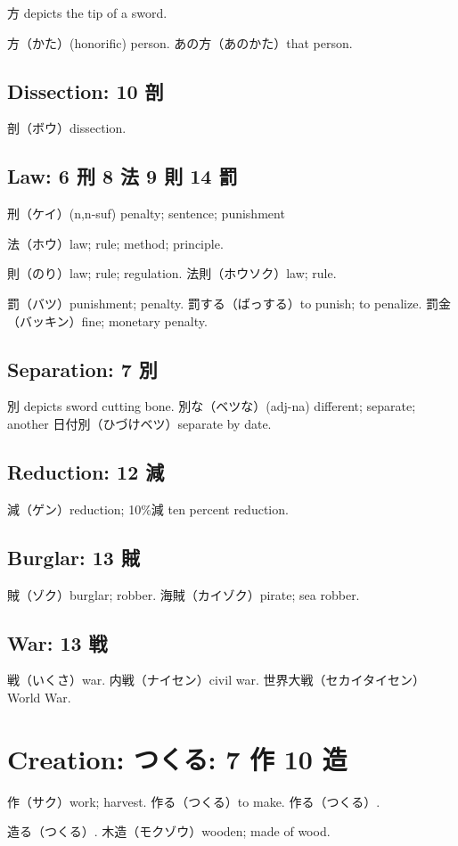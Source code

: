 方 depicts the tip of a sword.

方（かた）(honorific) person.
あの方（あのかた）that person.

\subsection{Dissection: 10 剖}

剖（ボウ）dissection.

\subsection{Law: 6 刑 8 法 9 則 14 罰}

刑（ケイ）(n,n-suf) penalty; sentence; punishment

法（ホウ）law; rule; method; principle.

則（のり）law; rule; regulation.
法則（ホウソク）law; rule.

罰（バツ）punishment; penalty.
罰する（ばっする）to punish; to penalize.
罰金（バッキン）fine; monetary penalty.

\subsection{Separation: 7 別}

別 depicts sword cutting bone.
別な（ベツな）(adj-na) different; separate; another
日付別（ひづけベツ）separate by date.

\subsection{Reduction: 12 減}

減（ゲン）reduction; 10\%減 ten percent reduction.

\subsection{Burglar: 13 賊}

賊（ゾク）burglar; robber.
海賊（カイゾク）pirate; sea robber.

\subsection{War: 13 戦}

戦（いくさ）war.
内戦（ナイセン）civil war.
世界大戦（セカイタイセン）World War.

\section{Creation: つくる: 7 作 10 造}

作（サク）work; harvest.
作る（つくる）to make.
作る（つくる）.

造る（つくる）.
木造（モクゾウ）wooden; made of wood.
